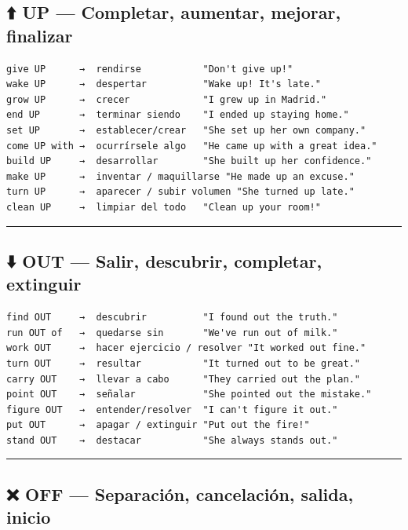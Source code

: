 \documentclass[
  spanish,
  letterpaper,
]{scrbook}
\begin{document}
\subsection{⬆️ UP --- Completar, aumentar, mejorar,
finalizar}\label{up-completar-aumentar-mejorar-finalizar}

\begin{verbatim}
give UP      →  rendirse           "Don't give up!"
wake UP      →  despertar          "Wake up! It's late."
grow UP      →  crecer             "I grew up in Madrid."
end UP       →  terminar siendo    "I ended up staying home."
set UP       →  establecer/crear   "She set up her own company."
come UP with →  ocurrírsele algo   "He came up with a great idea."
build UP     →  desarrollar        "She built up her confidence."
make UP      →  inventar / maquillarse "He made up an excuse."
turn UP      →  aparecer / subir volumen "She turned up late."
clean UP     →  limpiar del todo   "Clean up your room!"
\end{verbatim}

\begin{center}\rule{0.5\linewidth}{0.5pt}\end{center}

\subsection{⬇️ OUT --- Salir, descubrir, completar,
extinguir}\label{out-salir-descubrir-completar-extinguir}

\begin{verbatim}
find OUT     →  descubrir          "I found out the truth."
run OUT of   →  quedarse sin       "We've run out of milk."
work OUT     →  hacer ejercicio / resolver "It worked out fine."
turn OUT     →  resultar           "It turned out to be great."
carry OUT    →  llevar a cabo      "They carried out the plan."
point OUT    →  señalar            "She pointed out the mistake."
figure OUT   →  entender/resolver  "I can't figure it out."
put OUT      →  apagar / extinguir "Put out the fire!"
stand OUT    →  destacar           "She always stands out."
\end{verbatim}

\begin{center}\rule{0.5\linewidth}{0.5pt}\end{center}

\subsection{❌ OFF --- Separación, cancelación, salida,
inicio}\label{off-separaciuxf3n-cancelaciuxf3n-salida-inicio}
\end{document}
